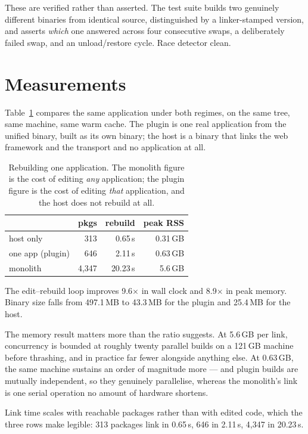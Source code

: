 \documentclass[11pt]{article}
\begin{document}
These are verified rather than asserted. The test suite builds two genuinely
different binaries from identical source, distinguished by a linker-stamped
version, and asserts \emph{which} one answered across four consecutive swaps, a
deliberately failed swap, and an unload/restore cycle. Race detector clean.

\section{Measurements}

Table~\ref{tab:gains} compares the same application under both regimes, on the
same tree, same machine, same warm cache. The plugin is one real application
from the unified binary, built as its own binary; the host is a binary that
links the web framework and the transport and no application at all.

\begin{table}[h]
\centering
\begin{tabular}{lrrr}
\toprule
& \textbf{pkgs} & \textbf{rebuild} & \textbf{peak RSS} \\
\midrule
host only        &   313 &  0.65\,s & 0.31\,GB \\
one app (plugin) &   646 &  2.11\,s & 0.63\,GB \\
monolith         & 4{,}347 & 20.23\,s & 5.6\,GB \\
\bottomrule
\end{tabular}
\caption{Rebuilding one application. The monolith figure is the cost of editing
\emph{any} application; the plugin figure is the cost of editing \emph{that}
application, and the host does not rebuild at all.}
\label{tab:gains}
\end{table}

The edit--rebuild loop improves 9.6$\times$ in wall clock and 8.9$\times$ in
peak memory. Binary size falls from 497.1\,MB to 43.3\,MB for the plugin and
25.4\,MB for the host.

The memory result matters more than the ratio suggests. At 5.6\,GB per link,
concurrency is bounded at roughly twenty parallel builds on a 121\,GB machine
before thrashing, and in practice far fewer alongside anything else. At
0.63\,GB, the same machine sustains an order of magnitude more --- and plugin
builds are mutually independent, so they genuinely parallelise, whereas the
monolith's link is one serial operation no amount of hardware shortens.

Link time scales with reachable packages rather than with edited code, which the
three rows make legible: 313 packages link in 0.65\,s, 646 in 2.11\,s, 4{,}347
in 20.23\,s.
\end{document}
